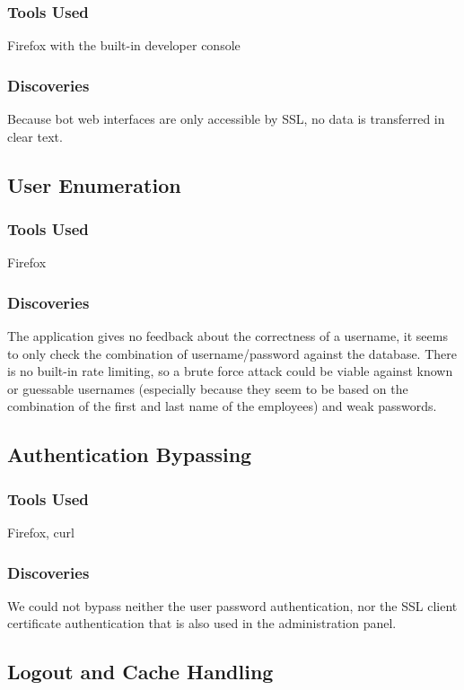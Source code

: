 \documentclass{article}
\begin{document}
\subsubsection{Tools Used}
Firefox with the built-in developer console

\subsubsection{Discoveries}
Because bot web interfaces are only accessible by SSL, no data is transferred in clear text.

\subsection{User Enumeration}
\subsubsection{Tools Used}
Firefox

\subsubsection{Discoveries}
The application gives no feedback about the correctness of a username, it seems to only check the combination of username/password against the database. There is no built-in rate limiting, so a brute force attack could be viable against known or guessable usernames (especially because they seem to be based on the combination of the first and last name of the employees) and weak passwords.

\subsection{Authentication Bypassing}
\subsubsection{Tools Used}
Firefox, curl

\subsubsection{Discoveries}
We could not bypass neither the user password authentication, nor the SSL client certificate authentication that is also used in the administration panel.

\subsection{Logout and Cache Handling}
\end{document}
